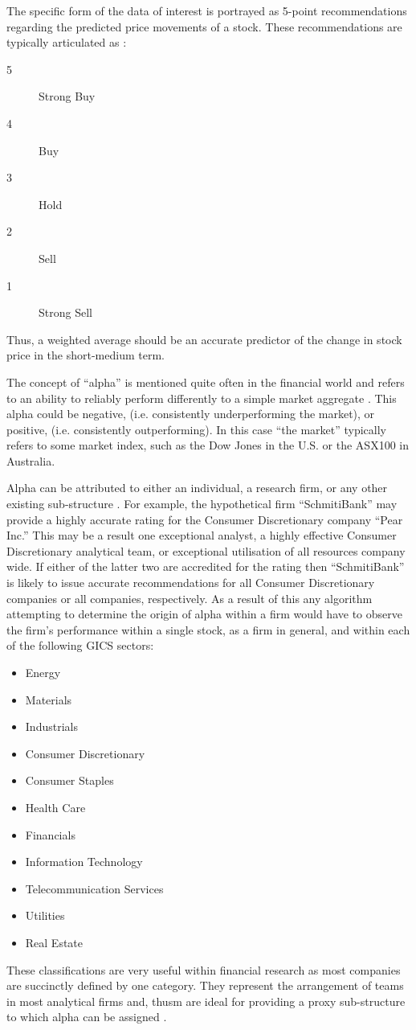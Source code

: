 The specific form of the data of interest is portrayed as  5-point recommendations regarding the predicted price movements of a stock. These recommendations are typically articulated as \cite{ibesMan}:
\begin{description}
    \item[5] Strong Buy
    \item[4] Buy
    \item[3] Hold
    \item[2] Sell
    \item[1] Strong Sell
\end{description}
Thus, a weighted average should be an accurate predictor of the change in stock price in the short-medium term.

The concept of ``alpha'' is mentioned quite often in the financial world and refers to an ability to reliably perform differently to a simple market aggregate \cite{blanchett2013alpha, holmes2009seeking}. This alpha could be negative, (i.e. consistently underperforming the market), or positive, (i.e. consistently outperforming). In this case ``the market'' typically refers to some market index, such as the Dow Jones in the U.S. or the ASX100 in Australia.

Alpha can be attributed to either an individual, a research firm, or any other existing sub-structure \cite{hung2009defining}. For example, the hypothetical firm ``SchmitiBank'' may provide a highly accurate rating for the Consumer Discretionary company ``Pear Inc.'' This may be a result one exceptional analyst, a highly effective Consumer Discretionary analytical team, or exceptional utilisation of all resources company wide. If either of the latter two are accredited for the rating then ``SchmitiBank'' is likely to issue accurate recommendations for all Consumer Discretionary companies or all companies, respectively. As a result of this any algorithm attempting to determine the origin of alpha within a firm would have to observe the firm's performance within a single stock, as a firm in general, and within each of the following GICS sectors:
\begin{itemize}
    \item Energy
    \item Materials
    \item Industrials
    \item Consumer Discretionary
    \item Consumer Staples
    \item Health Care
    \item Financials
    \item Information Technology
    \item Telecommunication Services
    \item Utilities
    \item Real Estate
\end{itemize}
These classifications are very useful within financial research as most companies are succinctly defined by one category. They represent the arrangement of teams in most analytical firms and, thusm are ideal for providing a proxy sub-structure to which alpha can be assigned \cite{robert2003strategic}. 